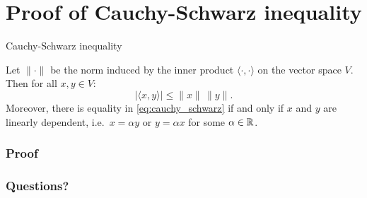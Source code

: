 \documentclass{beamer}
\begin{document}
\section{Proof of Cauchy-Schwarz inequality}
\begin{frame}[t]{Cauchy-Schwarz inequality}
	\grid

	\vspace{-0.4cm}
\begin{theorem}
	Let $\| \cdot \|$ be the norm induced by the inner product $\langle \cdot , \cdot \rangle$ on the vector space $V$. Then for all $x,y \in V$:
	\begin{equation}\label{eq:cauchy_schwarz}
	| \langle x,y \rangle | \leq \|x\| \, \|y\|.
	\end{equation}
	Moreover, there is equality in \eqref{eq:cauchy_schwarz} if and only if $x$ and $y$ are linearly dependent, i.e.\ $x = \alpha y$ or $y = \alpha x$ for some $\alpha \in \mathbb{R}$.
\end{theorem}
\end{frame}
\begin{frame}[t]
	\frametitle{Proof}
	\grid

	\pause
	\pause
\end{frame}

\appendix
\backupbegin
\begin{frame}[t]
	\frametitle{Questions?}
	\grid

	\pause
	\pause
\end{frame}
\backupend
\end{document}
